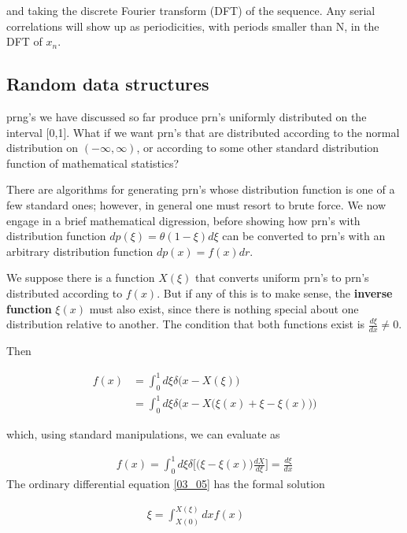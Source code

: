 and taking the discrete Fourier transform (DFT) of the sequence. Any serial correlations will show up as periodicities, with periods smaller than N, in the DFT of $x_n$.

\subsection{Random data structures}
prng's we have discussed so far produce prn's uniformly distributed on the interval [0,1]. What if we want prn's that are distributed according to the normal distribution on $(-\infty,\infty)$, or according to some other standard distribution function of mathematical statistics?

There are algorithms for generating prn's whose distribution function is one of a few standard ones; however, in general one must resort to brute force. We now engage in a brief mathematical digression, before showing how prn's with distribution function $dp(\xi) = \theta(1 - \xi)d\xi$ can be converted to prn's with an arbitrary distribution function $dp(x) =f(x)dr$.

We suppose there is a function $X(\xi)$ that converts uniform prn's to prn's distributed according to $f(x)$. But if any of this is to make sense, the \textbf{inverse function} $\xi(x)$ must also exist, since there is nothing special about one distribution relative to another. The condition that both functions exist is $\frac{d\xi}{dx}\neq 0$.

Then

\begin{align}
    f(x) &= \int_{0}^{1}d\xi\delta \Big(x-X(\xi)\Big)\nonumber \\
         &= \int_{0}^{1}d\xi\delta \Big(x-X\Big(\xi(x)+\xi-\xi(x)\Big)\Big)
\end{align}

which, using standard manipulations, we can evaluate as

\begin{eqnarray} 
    f(x)=\int_{0}^{1}d\xi\delta \Big[\Big(\xi-\xi(x)\Big)\frac{dX}{d\xi}\Big]=\frac{d\xi}{dx} \label{03_05}
\end{eqnarray} 
The ordinary differential equation \ref{03_05} has the formal solution

\begin{eqnarray} 
    \xi=\int_{X(0)}^{X(\xi)}dx f(x) \label{03_06} &&
\end{eqnarray} 

